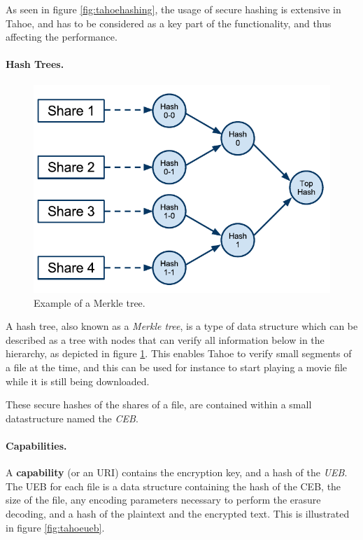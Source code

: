 \documentclass[english,12pt,a4paper]{book}
\begin{document}
As seen in figure \ref{fig:tahoehashing}, the usage of secure hashing is
extensive in Tahoe, and has to be considered as a key part of the functionality,
and thus affecting the performance.

\paragraph{Hash Trees.}

\begin{figure}[h]
    \centering
    \includegraphics[width=0.9\columnwidth]{Tahoe-MerkleTree.pdf}
    \caption{Example of a Merkle tree.}
    \label{fig:tahoemerkletree}
\end{figure}

A hash tree, also known as a \emph{Merkle tree}, is a type of data structure
which can be described as a tree with nodes that can verify all information
below in the hierarchy, as depicted in figure \ref{fig:tahoemerkletree}. This
enables Tahoe to verify small segments of a file at the time, and this can be
used for instance to start playing a movie file while it is still being
downloaded.

These secure hashes of the shares of a file, are contained within a small
datastructure named the \emph{\ac{CEB}}.

\paragraph{Capabilities.}

A \textbf{capability} (or an URI) contains the encryption key, and a hash of the
\emph{\ac{UEB}}. The \ac{UEB} for each file is a data structure containing the
hash of the \ac{CEB}, the size of the file, any encoding parameters necessary to
perform the erasure decoding, and a hash of the plaintext and the encrypted
text. This is illustrated in figure \ref{fig:tahoeueb}.
\end{document}
